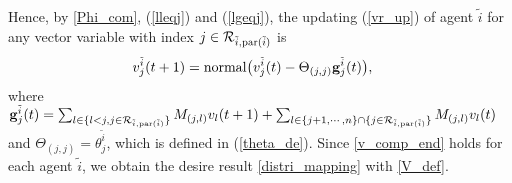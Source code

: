 \documentclass[journal]{IEEEtran}
\begin{document}
\par  Hence, by \eqref{Phi_com}, (\ref{lleqj}) and  (\ref{lgeqj}), the updating (\ref{vr_up}) of agent $\tilde{i}$ for any vector variable with index $j\in \mathcal{R}_{\tilde{i},{\rm par}(\tilde{i})}$ is 
\begin{align}\label{v_comp_end}
&v_j^{\tilde{i}}(t+1)={\rm normal}\big(v^{\tilde{i}}_j(t)-\Theta_{(j,j)}\mathbf{g}^{\tilde{i}}_j(t)\big),
\end{align}
where $\mathbf{g}_j^{\tilde{i}}(t)=\sum_{l\in  \{l<j,j\in \mathcal{R}_{\tilde{i},{\rm par}(\tilde{i})}\}} M_{(j,l)} v_l(t+1)+\sum_{l\in \{j+1,\cdots,n\}\cap \{j\in \mathcal{R}_{\tilde{i},{\rm par}(\tilde{i})} \}} M_{(j,l)} v_l(t)$ and $\Theta_{(j,j)}=\theta_j^{\tilde{i}}$, which is defined in (\ref{theta_de}). Since \eqref{v_comp_end} holds for each agent $\tilde{i}$, we obtain the desire result \eqref{distri_mapping} with \eqref{V_def}. 
%
\end{document}
